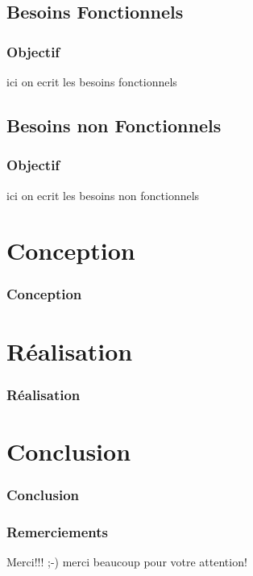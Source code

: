 \documentclass[11pt]{beamer}
\begin{document}
\subsection{Besoins Fonctionnels}
\begin{frame}
\frametitle{Objectif}
\begin{block}{}
ici on ecrit les besoins fonctionnels
\end{block}
\end{frame}

\subsection{Besoins non Fonctionnels}
\begin{frame}
\frametitle{Objectif}
\begin{block}{}
ici on ecrit les besoins non fonctionnels
\end{block}
\end{frame}

\section{Conception}
\begin{frame}
\frametitle{Conception}
\end{frame}

\section{Réalisation}
\begin{frame}
\frametitle{Réalisation}
\end{frame}


\section{Conclusion}
\begin{frame}
\frametitle{Conclusion}
\end{frame}

\begin{frame}
\frametitle{Remerciements}

\begin{block}{Merci!!! ;-)}
merci beaucoup pour votre attention!
\end{block}
\end{frame}
\end{document}
